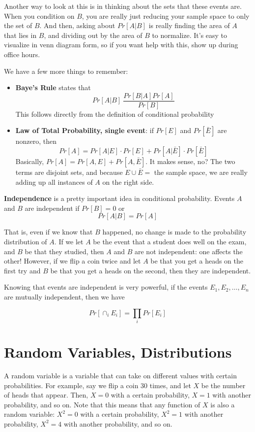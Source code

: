 \documentclass[11pt]{article}
\begin{document}
	Another way to look at this is in thinking about the sets that these events
	are.  When you condition on $B$, you are really just reducing your sample
	space to only the set of $B$.  And then, asking about $Pr[A|B]$ is really
	finding the area of $A$ that lies in $B$, and dividing out by the area of $B$
	to normalize.  It's easy to visualize in venn diagram form, so if you want help
	with this, show up during office hours. 
	
	
	We have a few more things to remember:
	
	\begin{itemize}
		\item \textbf{Baye's Rule} states that
		$$Pr[A | B] \ \frac{Pr[B | A] Pr[A]}{Pr[B]}$$
		This follows directly from the definition of conditional probability
		\item \textbf{Law of Total Probability, single event}:  if $Pr[E]$ and
		$Pr[\bar{E}]$ are nonzero, then
		$$Pr[A] = Pr[ A | E] \cdot Pr[E] + Pr[A | \bar{E}] \cdot Pr[\bar{E}]$$
		Basically, $Pr[A] = Pr[A, E] + Pr[A, \bar{E}]$.  It makes sense, no?  The
		two terms are disjoint sets, and because $E \cup \bar{E} = $ the sample
		space, we are really adding up all instances of $A$ on the right side.
	\end{itemize}
	
	\textbf{Independence} is a pretty important idea in conditional probability.  Events
	$A$ and $B$ are independent if $Pr[B] = 0$ or 
	$$Pr[A | B] = Pr[A]$$
	
	That is, even if we know that $B$ happened, no change is made to the probability 
	distribution of $A$.  If we let $A$ be the event that a student does well on the
	exam, and $B$ be that they studied, then $A$ and $B$ are not independent: one 
	affects the other!  However, if we flip a coin twice and let $A$ be that you get
	a heads on the first try and $B$ be that you get a heads on the second, then they
	are independent.  
	
	Knowing that events are independent is very powerful, if the events
	$E_1, E_2, \ldots, E_n$ are mutually independent, then we have
	
	$$Pr \left[ \cap_{i} E_i \right] = \prod_{i} Pr[E_i]$$
	
	\section{Random Variables, Distributions}
	
	A random variable is a variable that can take on different values with certain
	probabilities.  For example, say we flip a coin $30$ times, and let $X$ be 
	the number of heads that appear.  Then, $X = 0$ with a certain probability, 
	$X=1$ with another probability, and so on.  Note that this means that any
	function of $X$ is also a random variable: $X^2 = 0$ with a certain probability,
	$X^2 = 1$ with another probability, $X^2 = 4$ with another probability, and so on.
	
\end{document}
